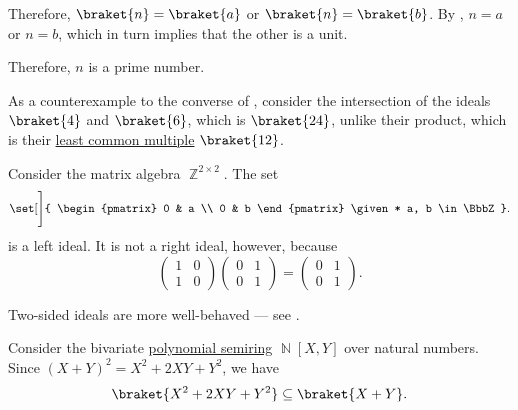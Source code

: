 \begin{example}
\begin{thmenum}
    Therefore, \( \braket{ n } = \braket{ a } \) or \( \braket{ n } = \braket{ b } \). By , \( n = a \) or \( n = b \), which in turn implies that the other is a unit.

    Therefore, \( n \) is a prime number.

     As a counterexample to the converse of , consider the intersection of the ideals \( \braket{ 4 } \) and \( \braket{ 6 } \), which is \( \braket{ 24 } \), unlike their product, which is their \hyperref[def:lcm]{least common multiple} \( \braket{ 12 } \).

     Consider the matrix algebra \( \BbbZ^{2 \times 2} \). The set
    \begin{equation*}
      \set[\Bigg]
      {
        \begin{pmatrix}
          0 & a \\
          0 & b
        \end{pmatrix}
        \given*
        a, b \in \BbbZ
      }.
    \end{equation*}
    is a left ideal. It is not a right ideal, however, because
    \begin{equation*}
      \begin{pmatrix}
        1 & 0 \\
        1 & 0
      \end{pmatrix}
      \begin{pmatrix}
        0 & 1 \\
        0 & 1
      \end{pmatrix}
      =
      \begin{pmatrix}
        0 & 1 \\
        0 & 1
      \end{pmatrix}.
    \end{equation*}

    Two-sided ideals are more well-behaved --- see .

     Consider the bivariate \hyperref[def:polynomial_algebra]{polynomial semiring} \( \BbbN[X, Y] \) over natural numbers. Since \( (X + Y)^2 = X^2 + 2XY + Y^2 \), we have
    \begin{equation*}
      \braket{ X^2 + 2XY + Y^2 } \subseteq \braket{ X + Y }.
    \end{equation*}


\end{thmenum}
\end{example}
